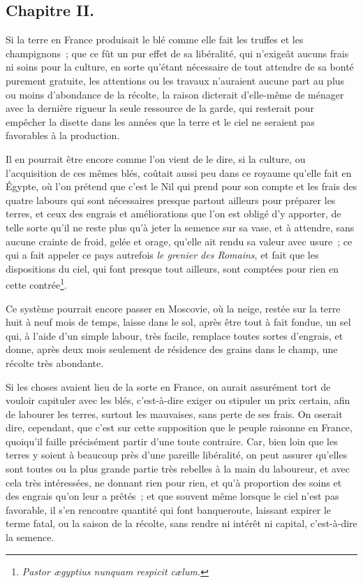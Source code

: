 \documentclass[french,twoside]{book} %
\begin{document}
\subsection[{Chapitre II.}]{Chapitre II.}
\noindent Si la terre en France produisait le blé comme elle fait les truffes et les champignons ; que ce fût un pur effet de sa libéralité, qui n’exigeât aucuns frais ni soins pour la culture, en sorte qu’étant nécessaire de tout attendre de sa bonté purement gratuite, les attentions ou les travaux n’auraient aucune part au plus ou moins d’abondance de la récolte, la raison dicterait d’elle-même de ménager avec la dernière rigueur la seule ressource de la garde, qui resterait pour empêcher la disette dans les années que la terre et le ciel ne seraient pas favorables à la production.\par
Il en pourrait être encore comme l’on vient de le dire, si la culture, ou l’acquisition de ces mêmes blés, coûtait aussi peu dans ce royaume qu’elle fait en Égypte, où l’on prétend que c’est le Nil qui prend pour son compte et les frais des quatre labours qui sont nécessaires presque partout ailleurs pour préparer les terres, et ceux des engrais et améliorations que l’on est obligé d’y apporter, de telle sorte qu’il ne reste plus qu’à jeter la semence sur sa vase, et à attendre, sans aucune crainte de froid, gelée et orage, qu’elle ait rendu sa valeur avec usure ; ce qui a fait appeler ce pays autrefois {\itshape le grenier des Romains}, et fait que les dispositions du ciel, qui font presque tout ailleurs, sont comptées pour rien en cette contrée\footnote{{\itshape Pastor ægyptius nunquam respicit cælum.}}.\par
Ce système pourrait encore passer en Moscovie, où la neige, restée sur la terre huit à neuf mois de temps, laisse dans le sol, après être tout à fait fondue, un sel qui, à l’aide d’un simple labour, très facile, remplace toutes sortes d’engrais, et donne, après deux mois seulement de résidence des grains dans le champ, une récolte très abondante.\par
Si les choses avaient lieu de la sorte en France, on aurait assurément tort de vouloir capituler avec les blés, c’est-à-dire exiger ou stipuler un prix certain, afin de labourer les terres, surtout les mauvaises, sans perte de ses frais. On oserait dire, cependant, que c’est sur cette supposition que le peuple raisonne en France, quoiqu’il faille précisément partir d’une toute contraire. Car, bien loin que les terres y soient à beaucoup près d’une pareille libéralité, on peut assurer qu’elles sont toutes ou la plus grande partie très rebelles à la main du laboureur, et avec cela très intéressées, ne donnant rien pour rien, et qu’à proportion des soins et des engrais qu’on leur a prêtés ; et que souvent même lorsque le ciel n’est pas favorable, il s’en rencontre quantité qui font banqueroute, laissant expirer le terme fatal, ou la saison de la récolte, sans rendre ni intérêt ni capital, c’est-à-dire la semence.\par
\end{document}
